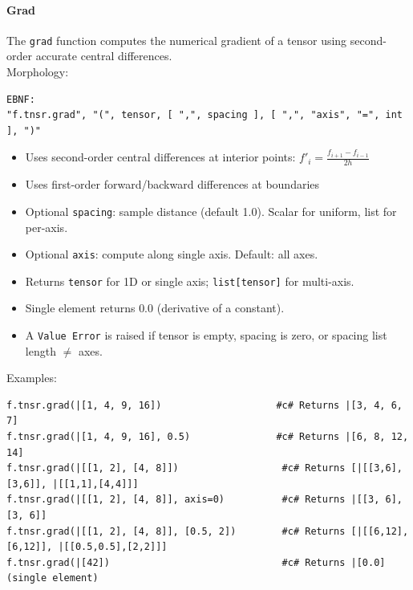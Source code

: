 \paragraph{Grad}
The \texttt{grad} function computes the numerical gradient of a tensor using second-order accurate central differences.\\
Morphology:
\begin{verbatim}
EBNF:
"f.tnsr.grad", "(", tensor, [ ",", spacing ], [ ",", "axis", "=", int ], ")"
\end{verbatim}
\begin{itemize}
\item Uses second-order central differences at interior points: $f'_i = \frac{f_{i+1} - f_{i-1}}{2h}$
\item Uses first-order forward/backward differences at boundaries
\item Optional \texttt{spacing}: sample distance (default 1.0). Scalar for uniform, list for per-axis.
\item Optional \texttt{axis}: compute along single axis. Default: all axes.
\item Returns \texttt{tensor} for 1D or single axis; \texttt{list[tensor]} for multi-axis.
\item Single element returns $0.0$ (derivative of a constant).
\item A \texttt{Value Error} is raised if tensor is empty, spacing is zero, or spacing list length $\neq$ axes.
\end{itemize}
Examples:
\begin{verbatim}
f.tnsr.grad(|[1, 4, 9, 16])                    #c# Returns |[3, 4, 6, 7]
f.tnsr.grad(|[1, 4, 9, 16], 0.5)               #c# Returns |[6, 8, 12, 14]
f.tnsr.grad(|[[1, 2], [4, 8]])                  #c# Returns [|[[3,6],[3,6]], |[[1,1],[4,4]]]
f.tnsr.grad(|[[1, 2], [4, 8]], axis=0)          #c# Returns |[[3, 6], [3, 6]]
f.tnsr.grad(|[[1, 2], [4, 8]], [0.5, 2])        #c# Returns [|[[6,12],[6,12]], |[[0.5,0.5],[2,2]]]
f.tnsr.grad(|[42])                              #c# Returns |[0.0]  (single element)
\end{verbatim}


